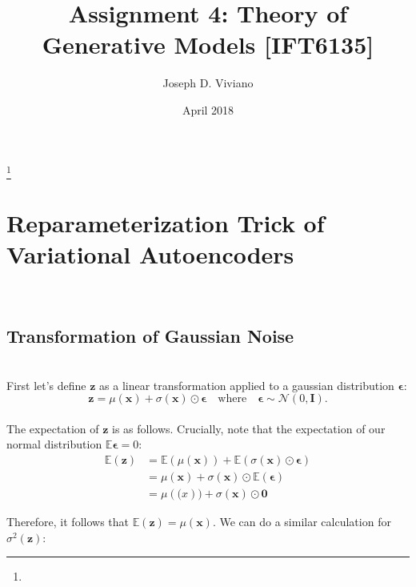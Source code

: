 \documentclass{amsart}
\numberwithin{equation}{section}
\theoremstyle{definition}
\theoremstyle{remark}
\begin{document}
\title{Assignment 4: Theory of Generative Models [IFT6135]}

\author{Joseph D. Viviano}
\address{Universit\'e de Montr\'eal}
\curraddr{}
\thanks{}
\date{April 2018}

\maketitle

\section{Reparameterization Trick of Variational Autoencoders} \\

\subsection{Transformation of Gaussian Noise} \\

First let's define $\bm{z}$ as a linear transformation applied to a gaussian 
distribution $\bm{\epsilon}$: \\

$$\bm{z}= \mu(\bm{x})+ \sigma(\bm{x})\odot\bm{\epsilon} \quad \text{where}\quad \bm{\epsilon} \sim \mathcal{N}(0, \bm{I}).$$ \\

The expectation of $\bm{z}$ is as follows. Crucially, note that the expectation
of our normal distribution $\mathbb{E}\bm{\epsilon} = 0$: \\

\begin{equation}
\begin{split}
\mathbb{E}(\bm{z})
&= \mathbb{E}(\mu(\bm{x}))+\mathbb{E}\left(\sigma(\bm{x})\odot \bm{\epsilon}\right)\\
&= \mu(\bm{x})+ \sigma(\bm{x})\odot \mathbb{E}(\bm{\epsilon})\\
&= \mu(\bm(x))+ \sigma(\bm{x})\odot \bm{0}
\end{split}
\end{equation}

Therefore, it follows that $ \mathbb{E}(\bm{z}) = \mu(\bm{x}) $. We can do a 
similar calculation for $\sigma^2(\bm{z})$: \\
\end{document}
